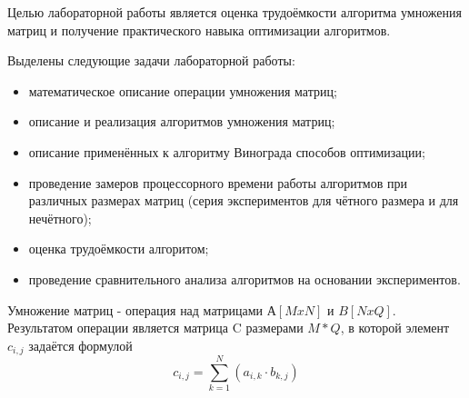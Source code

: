 Целью лабораторной работы является оценка трудоёмкости алгоритма умножения матриц и получение
практического навыка оптимизации алгоритмов.

Выделены следующие задачи лабораторной работы:

\begin{itemize}
\item математическое описание операции умножения матриц;
\item описание и реализация алгоритмов умножения матриц;
\item описание применённых к алгоритму Винограда способов оптимизации;
\item проведение замеров процессорного времени работы алгоритмов при различных размерах матриц 
(серия экспериментов для чётного размера и для нечётного);
\item оценка трудоёмкости алгоритом;
\item проведение сравнительного анализа алгоритмов на основании экспериментов.
\end{itemize}

Умножение матриц - операция над матрицами $ А[MxN] $ и $ B[NxQ] $. Результатом операции является матрица C размерами $ M*Q $, в которой элемент $c_{i,j}$ задаётся формулой
\begin{equation} 
	c_{i,j} = \sum_{k=1}^{N}(a_{i,k} \cdot b_{k,j})
\end{equation}

